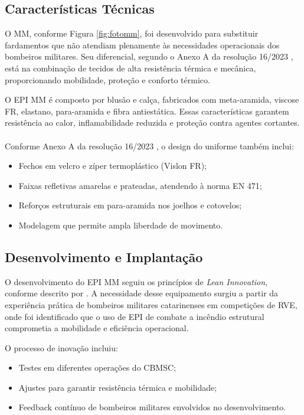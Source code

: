 \subsection{Características Técnicas}

O \acrlong{MM}, conforme Figura \ref{fig:fotomm}, foi desenvolvido para substituir fardamentos que não atendiam plenamente 
às necessidades operacionais dos bombeiros militares. Seu diferencial, segundo o Anexo A 
da resolução 16/2023 \cite{res16}, está na combinação de tecidos de alta resistência térmica e 
mecânica, proporcionando mobilidade, proteção e conforto térmico.

O \acrshort{EPI} \acrshort{MM} é composto por blusão e calça, fabricados com meta-aramida, viscose FR, elastano, 
para-aramida e fibra antiestática. Essas características garantem resistência ao calor, 
inflamabilidade reduzida e proteção contra agentes cortantes. 
\\\\
Conforme Anexo A da resolução 16/2023 \cite{res16}, o design do uniforme também inclui:
\begin{itemize}
    \item Fechos em velcro e zíper termoplástico (Vislon FR);
    \item Faixas refletivas amarelas e prateadas, atendendo à norma EN 471;
    \item Reforços estruturais em para-aramida nos joelhos e cotovelos;
    \item Modelagem que permite ampla liberdade de movimento.
\end{itemize}




\subsection{Desenvolvimento e Implantação}

O desenvolvimento do \acrshort{EPI} \acrlong{MM} seguiu os princípios de \textit{Lean Innovation}, 
conforme descrito por \textcite{Melina2023}. A necessidade desse equipamento surgiu a partir 
da experiência prática de bombeiros militares catarinenses em competições de \acrfull{RVE}, 
onde foi identificado que o uso de \acrshort{EPI} de combate a incêndio estrutural 
comprometia a mobilidade e eficiência operacional.

O processo de inovação incluiu:
\begin{itemize}
    \item Testes em diferentes operações do \acrshort{CBMSC};
    \item Ajustes para garantir resistência térmica e mobilidade;
    \item Feedback contínuo de bombeiros militares envolvidos no desenvolvimento.
\end{itemize}

